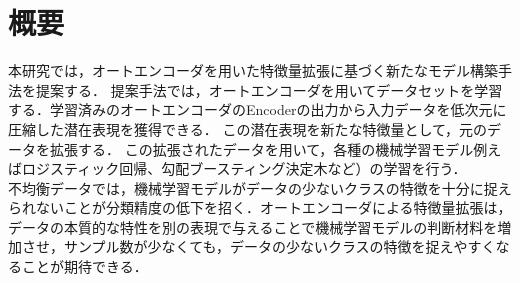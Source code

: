 \section{概要}
本研究では，オートエンコーダを用いた特徴量拡張に基づく新たなモデル構築手法を提案する．\cite{ae-article}
提案手法では，オートエンコーダを用いてデータセットを学習する．学習済みのオートエンコーダのEncoderの出力から入力データを低次元に圧縮した潜在表現を獲得できる．
この潜在表現を新たな特徴量として，元のデータを拡張する．
この拡張されたデータを用いて，各種の機械学習モデル例えばロジスティック回帰、勾配ブースティング決定木など）の学習を行う．
\\
不均衡データでは，機械学習モデルがデータの少ないクラスの特徴を十分に捉えられないことが分類精度の低下を招く．オートエンコーダによる特徴量拡張は，データの本質的な特性を別の表現で与えることで機械学習モデルの判断材料を増加させ，サンプル数が少なくても，データの少ないクラスの特徴を捉えやすくなることが期待できる．\\

